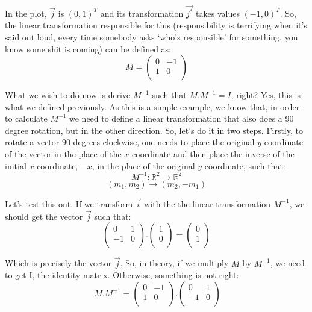 \documentclass[a4,12pt,twosided,openany]{memoir}
\begin{document}
\par 
\indent
In the plot, $\overrightarrow{j}$ is $(0,1)^T$ and its transformation $\overrightarrow{j^*}$ takes values $(-1,0)^T$. So, the linear transformation responsible for this (responsibility is terrifying when it’s said out loud, every time somebody asks ‘who’s responsible’ for something, you know some shit is coming) can be defined as:
\[M = \begin{pmatrix}
0 & -1\\
1 & 0\\
\end{pmatrix}\]
\par 
\indent
What we wish to do now is derive $M^{−1}$ such that $M.M^{−1}= I $, right? Yes, this is what we defined previously. As this is a simple example, we know that, in order to calculate $M^{-1}$ we need to define a linear transformation that also does a 90 degree rotation, but in the other direction. So, let’s do it in two steps. Firstly, to rotate a vector 90 degrees clockwise, one needs to place the original $y$ coordinate of the vector in the place of the $x$ coordinate and then place the inverse of the initial $x$ coordinate, $−x$, in the place of the original $y$ coordinate, such that:
\[M^{-1}:\mathbb{R}^2 \rightarrow \mathbb{R}^2\]
\[(m_1,m_2) \rightarrow (m_2, -m_1) \]
\par 
\indent
Let’s test this out. If we transform $\overrightarrow{i}$ with the the linear transformation $M^{−1}$, we should get the vector  $\overrightarrow{j}$ such that:
\[\begin{pmatrix}
0 & 1 \\
-1 & 0 \\
\end{pmatrix}.\begin{pmatrix}
1  \\
0 \\
\end{pmatrix} = \begin{pmatrix}
0 \\
1 \\
\end{pmatrix}
\]
\par 
\indent
Which is precisely the vector $\overrightarrow{j}$. So, in theory, if we multiply $M$ by $M^{−1}$, we need to get I, the identity matrix. Otherwise, something is not right:
\[~M.M^{-1} = \begin{pmatrix}
0 & -1\\
1 & 0\\
\end{pmatrix}. \begin{pmatrix}
0 & 1 \\
-1 & 0 \\
\end{pmatrix}
\]
\end{document}
